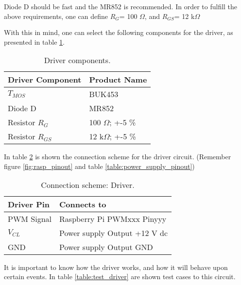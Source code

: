 Diode D should be fast and the MR852 is recommended.
In order to fulfill the above requirements, one can define \(R_{G}\)= 100 $\Omega$, and \(R_{GS}\)= 12 k$\Omega$  \linebreak

With this in mind, one can select the following components for the driver, as presented in table \ref{table:driver_components}.

\begin{table}[H]
	\centering
		\begin{tabular}{|m{5cm}|m{6cm}|}
			\hline
			\textbf{Driver Component} & \textbf{Product Name}
			\\\hline\hline
			
			\(T_{MOS}\) & BUK453
			\\\hline
			Diode D & MR852
			\\\hline
			Resistor \(R_{G}\) & 100 $\Omega$; +-5 \%
			\\\hline
			Resistor \(R_{GS}\) & 12 k$\Omega$; +-5 \%
			\\\hline
		\end{tabular}
	\caption{Driver components.}
	\label{table:driver_components}
\end{table}

In table \ref{table:connect_driver} is shown the connection scheme for the driver circuit. (Remember figure \ref{fig:rasp_pinout} and table \ref{table:power_supply_pinout})

\begin{table}[H]
	\centering
	\begin{tabular}{|m{5cm}|m{6cm}|}
		\hline
		\textbf{Driver Pin} & \textbf{Connects to}
		\\\hline\hline
		
		PWM Signal & Raspberry Pi PWMxxx Pinyyy
		\\\hline
		\(V_{CL}\) & Power supply Output +12 V \ac{dc}
		\\\hline
		GND & Power supply Output GND
		\\\hline
	\end{tabular}
	
	\caption{Connection scheme: Driver.}
	\label{table:connect_driver}
\end{table}

It is important to know how the driver works, and how it will behave upon certain events. In table \ref{table:test_driver} are shown test cases to this circuit.

